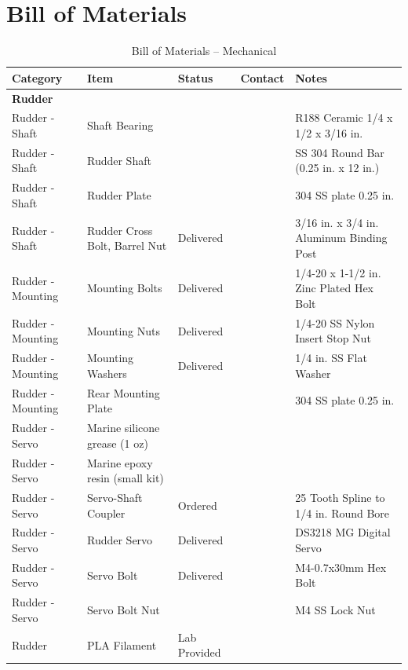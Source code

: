
\section{Bill of Materials}
\label{sec:bom}

\begin{table}[htbp]
\centering
\caption{Bill of Materials -- Mechanical}
\footnotesize
\begin{tabular}{|p{2.2cm}|p{5.5cm}|p{2.2cm}|p{2.5cm}|p{3.5cm}|}
\hline
\textbf{Category} & \textbf{Item} & \textbf{Status} & \textbf{Contact} & \textbf{Notes} \\
\hline
\multicolumn{5}{|l|}{\textbf{Rudder}} \\
\hline
Rudder - Shaft & Shaft Bearing & & & R188 Ceramic 1/4 x 1/2 x 3/16 in. \\
\hline
Rudder - Shaft & Rudder Shaft & & & SS 304 Round Bar (0.25 in. x 12 in.) \\
\hline
Rudder - Shaft & Rudder Plate & & & 304 SS plate 0.25 in. \\
\hline
Rudder - Shaft & Rudder Cross Bolt, Barrel Nut & Delivered & & 3/16 in. x 3/4 in. Aluminum Binding Post \\
\hline
Rudder - Mounting & Mounting Bolts & Delivered & & 1/4-20 x 1-1/2 in. Zinc Plated Hex Bolt \\
\hline
Rudder - Mounting & Mounting Nuts & Delivered & & 1/4-20 SS Nylon Insert Stop Nut \\
\hline
Rudder - Mounting & Mounting Washers & Delivered & & 1/4 in. SS Flat Washer \\
\hline
Rudder - Mounting & Rear Mounting Plate & & & 304 SS plate 0.25 in. \\
\hline
Rudder - Servo & Marine silicone grease (1 oz) & & & \\
\hline
Rudder - Servo & Marine epoxy resin (small kit) & & & \\
\hline
Rudder - Servo & Servo-Shaft Coupler & Ordered & & 25 Tooth Spline to 1/4 in. Round Bore \\
\hline
Rudder - Servo & Rudder Servo & Delivered & & DS3218 MG Digital Servo \\
\hline
Rudder - Servo & Servo Bolt & Delivered & & M4-0.7x30mm Hex Bolt \\
\hline
Rudder - Servo & Servo Bolt Nut & & & M4 SS Lock Nut \\
\hline
Rudder & PLA Filament & Lab Provided & & \\
\hline

\end{tabular}
\end{table}
